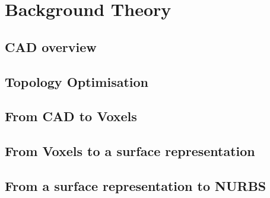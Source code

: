 \chapter{Background Theory}
\label{chapter:Background}

\section{CAD overview}


\section{Topology Optimisation}


\section{From CAD to Voxels}


\section{From Voxels to a surface representation}


\section{From a surface representation to NURBS}
\label{sec:NURBS}



